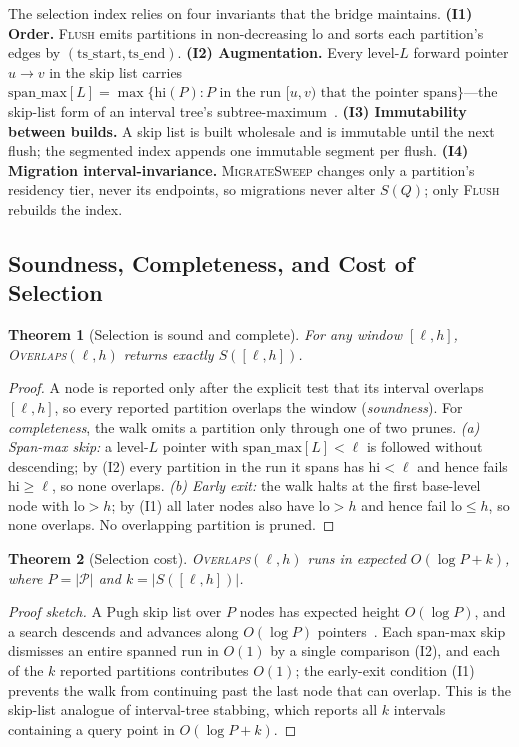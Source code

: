 \documentclass[10pt]{article}
\newtheorem{theorem}{Theorem}
\theoremstyle{definition}
\begin{document}
The selection index relies on four invariants that the bridge maintains.
\textbf{(I1) Order.} \textsc{Flush} emits partitions in non-decreasing
$\mathrm{lo}$ and sorts each partition's edges by
$(\mathrm{ts\_start},\mathrm{ts\_end})$.
\textbf{(I2) Augmentation.} Every level-$L$ forward pointer $u\!\rightarrow\!v$ in
the skip list carries $\mathrm{span\_max}[L]=\max\{\mathrm{hi}(P): P \text{ in the
run } [u,v) \text{ that the pointer spans}\}$---the skip-list form of an interval
tree's subtree-maximum~\citep[\S14.3]{clrs2009}.
\textbf{(I3) Immutability between builds.} A skip list is built wholesale and is
immutable until the next flush; the segmented index appends one immutable segment
per flush.
\textbf{(I4) Migration interval-invariance.} \textsc{MigrateSweep} changes only a
partition's residency tier, never its endpoints, so migrations never alter $S(Q)$;
only \textsc{Flush} rebuilds the index.

\subsection{Soundness, Completeness, and Cost of Selection}
\label{sec:selection}

\begin{theorem}[Selection is sound and complete]
\label{thm:sound}
For any window $[\ell,h]$, \textsc{Overlaps}$(\ell,h)$ returns exactly $S([\ell,h])$.
\end{theorem}
\begin{proof}
A node is reported only after the explicit test that its interval overlaps
$[\ell,h]$, so every reported partition overlaps the window (\emph{soundness}).
For \emph{completeness}, the walk omits a partition only through one of two prunes.
\emph{(a) Span-max skip:} a level-$L$ pointer with $\mathrm{span\_max}[L]<\ell$ is
followed without descending; by (I2) every partition in the run it spans has
$\mathrm{hi}<\ell$ and hence fails $\mathrm{hi}\ge\ell$, so none overlaps.
\emph{(b) Early exit:} the walk halts at the first base-level node with
$\mathrm{lo}>h$; by (I1) all later nodes also have $\mathrm{lo}>h$ and hence fail
$\mathrm{lo}\le h$, so none overlaps. No overlapping partition is pruned.
\end{proof}

\begin{theorem}[Selection cost]
\label{thm:cost}
\textsc{Overlaps}$(\ell,h)$ runs in expected $O(\log P + k)$, where $P=|\mathcal{P}|$
and $k=|S([\ell,h])|$.
\end{theorem}
\begin{proof}[Proof sketch]
A Pugh skip list over $P$ nodes has expected height $O(\log P)$, and a search
descends and advances along $O(\log P)$ pointers~\citep{pugh1990skiplists}. Each
span-max skip dismisses an entire spanned run in $O(1)$ by a single comparison
(I2), and each of the $k$ reported partitions contributes $O(1)$; the early-exit
condition (I1) prevents the walk from continuing past the last node that can
overlap. This is the skip-list analogue of interval-tree stabbing, which reports
all $k$ intervals containing a query point in $O(\log P + k)$.
\end{proof}
\end{document}
